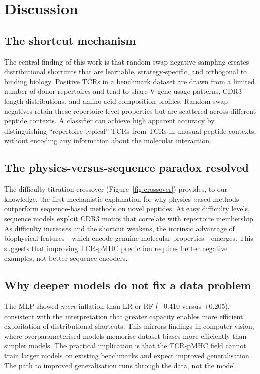 \documentclass[11pt, a4paper]{article}
\begin{document}
\section{Discussion}

\subsection{The shortcut mechanism}

The central finding of this work is that random-swap negative sampling creates distributional shortcuts that are learnable, strategy-specific, and orthogonal to binding biology. Positive TCRs in a benchmark dataset are drawn from a limited number of donor repertoires and tend to share V-gene usage patterns, CDR3 length distributions, and amino acid composition profiles. Random-swap negatives retain these repertoire-level properties but are scattered across different peptide contexts. A classifier can achieve high apparent accuracy by distinguishing ``repertoire-typical'' TCRs from TCRs in unusual peptide contexts, without encoding any information about the molecular interaction.

\subsection{The physics-versus-sequence paradox resolved}

The difficulty titration crossover (Figure~\ref{fig:crossover}) provides, to our knowledge, the first mechanistic explanation for why physics-based methods outperform sequence-based methods on novel peptides. At easy difficulty levels, sequence models exploit CDR3 motifs that correlate with repertoire membership. As difficulty increases and the shortcut weakens, the intrinsic advantage of biophysical features---which encode genuine molecular properties---emerges. This suggests that improving TCR-pMHC prediction requires better negative examples, not better sequence encoders.

\subsection{Why deeper models do not fix a data problem}

The MLP showed \textit{more} inflation than LR or RF (+0.410 versus +0.205), consistent with the interpretation that greater capacity enables more efficient exploitation of distributional shortcuts. This mirrors findings in computer vision, where overparameterised models memorise dataset biases more efficiently than simpler models. The practical implication is that the TCR-pMHC field cannot train larger models on existing benchmarks and expect improved generalisation. The path to improved generalisation runs through the data, not the model.
\end{document}
